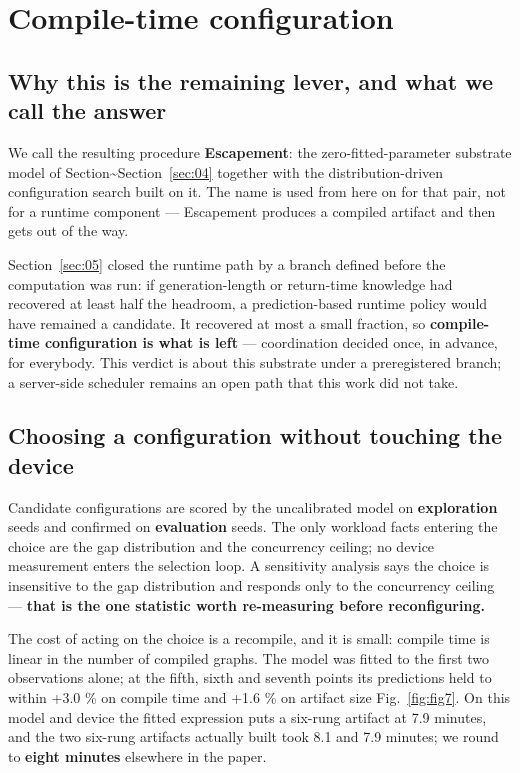 
\section{Compile-time configuration}
\label{sec:06}

\subsection{Why this is the remaining lever, and what we call the answer}

We call the resulting procedure \textbf{Escapement}: the zero-fitted-parameter substrate model of Section\textasciitilde{}Section~\ref{sec:04} together with the distribution-driven configuration search built on it. The name is used from here on for that pair, not for a runtime component --- Escapement produces a compiled artifact and then gets out of the way.


Section~\ref{sec:05} closed the runtime path by a branch defined before the computation was run: if generation-length or return-time knowledge had recovered at least half the headroom, a prediction-based runtime policy would have remained a candidate. It recovered at most a small fraction, so \textbf{compile-time configuration is what is left} --- coordination decided once, in advance, for everybody. This verdict is about this substrate under a preregistered branch; a server-side scheduler remains an open path that this work did not take.

\subsection{Choosing a configuration without touching the device}

Candidate configurations are scored by the uncalibrated model on \textbf{exploration} seeds and confirmed on \textbf{evaluation} seeds. The only workload facts entering the choice are the gap distribution and the concurrency ceiling; no device measurement enters the selection loop. A sensitivity analysis says the choice is insensitive to the gap distribution and responds only to the concurrency ceiling --- \textbf{that is the one statistic worth re-measuring before reconfiguring.}

The cost of acting on the choice is a recompile, and it is small: compile time is linear in the number of compiled graphs. The model was fitted to the first two observations alone; at the fifth, sixth and seventh points its predictions held to within +3.0 \% on compile time and +1.6 \% on artifact size Fig.~\ref{fig:fig7}. On this model and device the fitted expression puts a six-rung artifact at 7.9 minutes, and the two six-rung artifacts actually built took 8.1 and 7.9 minutes; we round to \textbf{eight minutes} elsewhere in the paper.

